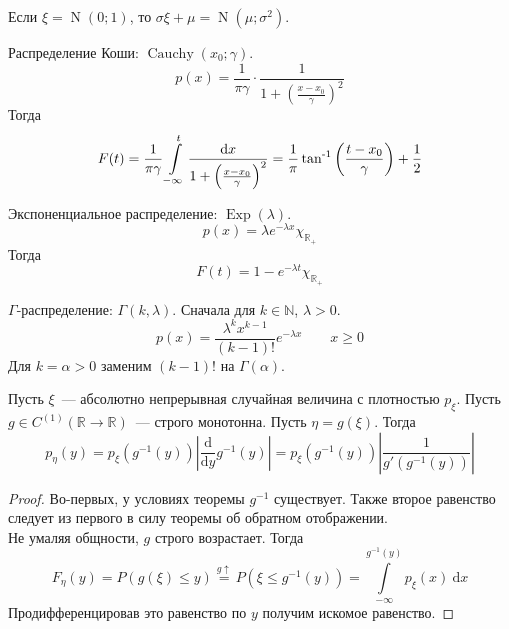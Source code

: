 \documentclass{article}
\begin{document}
    \begin{corollary}
        Если $\xi=\operatorname{N}(0;1)$, то $\sigma\xi+\mu=\operatorname{N}(\mu;\sigma^2)$.
    \end{corollary}
    \begin{example}
        \label{Распределение Коши}
        \label{Cauchy}
        Распределение Коши: $\operatorname{Cauchy}(x_0;\gamma)$.
        $$
        p(x)=\frac1{\pi\gamma}\cdot\frac1{1+\left(\frac{x-x_0}\gamma\right)^2}
        $$
        Тогда
        $$
        F(t)=\frac1{\pi\gamma}\int\limits_{-\infty}^t\frac{\mathrm dx}{1+\left(\frac{x-x_0}\gamma\right)^2}=\frac1\pi\operatorname{\tan^{-1}}\left(\frac{t-x_0}\gamma\right)+\frac12
        $$
    \end{example}
    \begin{example}
        \label{Экспоненциальное распределение}
        \label{Exp}
        Экспоненциальное распределение: $\operatorname{Exp}(\lambda)$.
        $$
        p(x)=\lambda e^{-\lambda x}\chi_{\mathbb R_+}
        $$
        Тогда
        $$
        F(t)=1-e^{-\lambda t}\chi_{\mathbb R_+}
        $$
    \end{example}
    \begin{example}
        \label{Gamma-распределение}
        $\Gamma$-распределение: $\Gamma(k,\lambda)$. Сначала для $k\in\mathbb N$, $\lambda>0$.
        $$
        p(x)=\frac{\lambda^kx^{k-1}}{(k-1)!}e^{-\lambda x}\qquad x\geqslant 0
        $$
        Для $k=\alpha>0$ заменим $(k-1)!$ на $\Gamma(\alpha)$.
    \end{example}
    \begin{claim}
        Пусть $\xi$~--- абсолютно непрерывная случайная величина с плотностью $p_\xi$. Пусть $g\in C^{(1)}(\mathbb R\to\mathbb R)$~--- строго монотонна. Пусть $\eta=g(\xi)$. Тогда
        $$
        p_\eta(y)=p_\xi(g^{-1}(y))\left|\frac{\mathrm d}{\mathrm dy}g^{-1}(y)\right|=p_\xi(g^{-1}(y))\left|\frac1{g'(g^{-1}(y))}\right|
        $$
    \end{claim}
    \begin{proof}
        Во-первых, у условиях теоремы $g^{-1}$ существует. Также второе равенство следует из первого в силу теоремы об обратном отображении.\\
        Не умаляя общности, $g$ строго возрастает. Тогда
        $$
        F_\eta(y)=P(g(\xi)\leqslant y)\overset{g\uparrow}=P(\xi\leqslant g^{-1}(y))=\int\limits_{-\infty}^{g^{-1}(y)}p_\xi(x)~\mathrm dx
        $$
        Продифференцировав это равенство по $y$ получим искомое равенство.
    \end{proof}
\end{document}
